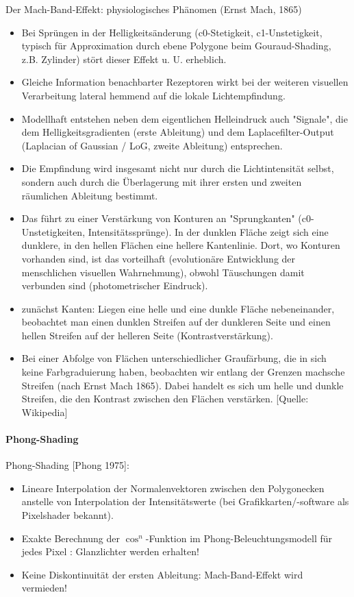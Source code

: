 \documentclass[10pt,landscape]{article}
\begin{document}
\begin{multicols}{3}
Der Mach-Band-Effekt: physiologisches Phänomen (Ernst Mach, 1865)
\begin{itemize}
  \item Bei Sprüngen in der Helligkeitsänderung (c0-Stetigkeit, c1-Unstetigkeit, typisch für Approximation durch ebene Polygone beim Gouraud-Shading, z.B. Zylinder) stört dieser Effekt u. U. erheblich.
  \item Gleiche Information benachbarter Rezeptoren wirkt bei der weiteren visuellen Verarbeitung lateral hemmend auf die lokale Lichtempfindung.
  \item Modellhaft entstehen neben dem eigentlichen Helleindruck auch "Signale", die dem Helligkeitsgradienten (erste Ableitung) und dem Laplacefilter-Output (Laplacian of Gaussian / LoG, zweite Ableitung) entsprechen.
  \item Die Empfindung wird insgesamt nicht nur durch die Lichtintensität selbst, sondern auch durch die Überlagerung mit ihrer ersten und zweiten räumlichen Ableitung bestimmt.
  \item Das führt zu einer Verstärkung von Konturen an "Sprungkanten" (c0-Unstetigkeiten, Intensitätssprünge). In der dunklen Fläche zeigt sich eine dunklere, in den hellen Flächen eine hellere Kantenlinie. Dort, wo Konturen vorhanden sind, ist das vorteilhaft (evolutionäre Entwicklung der menschlichen visuellen Wahrnehmung), obwohl Täuschungen damit verbunden sind (photometrischer Eindruck).
  \item zunächst Kanten: Liegen eine helle und eine dunkle Fläche nebeneinander, beobachtet man einen dunklen Streifen auf der dunkleren Seite und einen hellen Streifen auf der helleren Seite (Kontrastverstärkung).
  \item Bei einer Abfolge von Flächen unterschiedlicher Graufärbung, die in sich keine Farbgraduierung haben, beobachten wir entlang der Grenzen machsche Streifen (nach Ernst Mach 1865). Dabei handelt es sich um helle und dunkle Streifen, die den Kontrast zwischen den Flächen verstärken. [Quelle: Wikipedia]
\end{itemize}

\paragraph{Phong-Shading}
Phong-Shading [Phong 1975]:
\begin{itemize}
  \item Lineare Interpolation der Normalenvektoren zwischen den Polygonecken anstelle von Interpolation der Intensitätswerte (bei Grafikkarten/-software als Pixelshader bekannt).
  \item Exakte Berechnung der $\cos^n$-Funktion im Phong-Beleuchtungsmodell für jedes Pixel : Glanzlichter werden erhalten!
  \item Keine Diskontinuität der ersten Ableitung: Mach-Band-Effekt wird vermieden!
\end{itemize}



\end{multicols}
\end{document}
